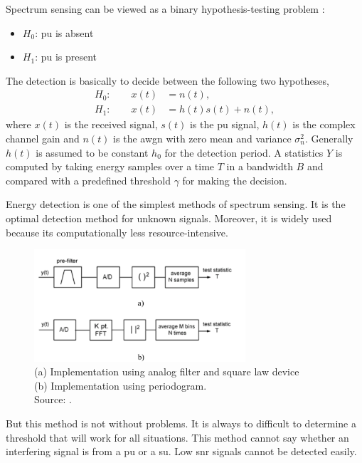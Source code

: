 Spectrum sensing can be viewed as a binary hypothesis-testing problem 
\cite{zhang09}:
\begin{itemize}[noitemsep,topsep=0pt,parsep=0pt,partopsep=0pt]
    \item $H_0$: \acrlong{pu} is absent
    \item $H_1$: \acrlong{pu} is present
\end{itemize}
The detection is basically to decide between the following two hypotheses,
\begin{align}
    H_0 : \qquad x(t) &= n(t),  \nonumber \\
    H_1 : \qquad x(t) &= h(t)s(t) + n(t),  \nonumber
\end{align}
where $x(t)$ is the received signal, $s(t)$ is the \gls{pu} signal, $h(t)$
is the complex channel gain and $n(t)$ is the \gls{awgn} with zero mean 
and variance $\sigma_n^2$. Generally $h(t)$ is assumed
to be constant $h_0$ for the detection period. A statistics $Y$ is computed by
taking energy samples over a time $T$ in a bandwidth $B$ and compared with a 
predefined threshold $\gamma$ for making the decision.

Energy detection is one of the simplest methods of spectrum sensing. It is the 
optimal detection method for unknown signals. Moreover, it is widely used 
because its computationally less resource-intensive.

\begin{figure}
    \centering
    \includegraphics[width=0.7\textwidth]{../images/energyDetection}
    \caption[Energy Detection block diagram]{(a) Implementation using analog 
    filter and square law device \\
    (b) Implementation using periodogram. \\
    Source: {\cite{cabric06}}.}
    \label{energyDetection}
\end{figure}

But this method is not without problems. It is always to difficult to 
determine a threshold that will work for all situations. This method cannot
say whether an interfering signal is from a \gls{pu} or a \gls{su}.
Low \gls{snr} signals cannot be detected easily.


